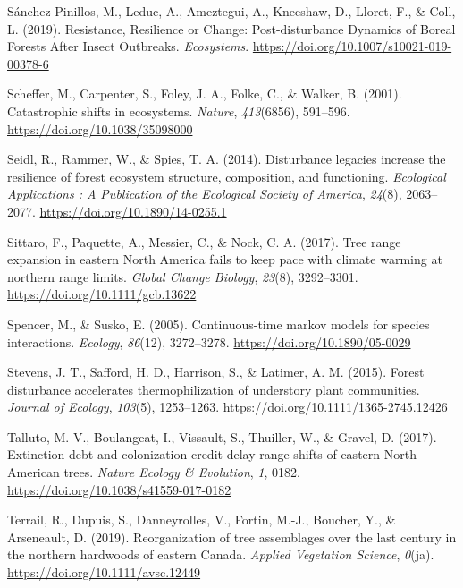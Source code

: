 \documentclass[a4paperpaper,]{article}
\begin{document}
\leavevmode\hypertarget{ref-sanchez-pinillos_resistance_2019}{}%
Sánchez-Pinillos, M., Leduc, A., Ameztegui, A., Kneeshaw, D., Lloret,
F., \& Coll, L. (2019). Resistance, Resilience or Change:
Post-disturbance Dynamics of Boreal Forests After Insect Outbreaks.
\emph{Ecosystems}. \url{https://doi.org/10.1007/s10021-019-00378-6}

\leavevmode\hypertarget{ref-scheffer_catastrophic_2001}{}%
Scheffer, M., Carpenter, S., Foley, J. A., Folke, C., \& Walker, B.
(2001). Catastrophic shifts in ecosystems. \emph{Nature},
\emph{413}(6856), 591--596. \url{https://doi.org/10.1038/35098000}

\leavevmode\hypertarget{ref-seidl_disturbance_2014}{}%
Seidl, R., Rammer, W., \& Spies, T. A. (2014). Disturbance legacies
increase the resilience of forest ecosystem structure, composition, and
functioning. \emph{Ecological Applications : A Publication of the
Ecological Society of America}, \emph{24}(8), 2063--2077.
\url{https://doi.org/10.1890/14-0255.1}

\leavevmode\hypertarget{ref-sittaro_tree_2017}{}%
Sittaro, F., Paquette, A., Messier, C., \& Nock, C. A. (2017). Tree
range expansion in eastern North America fails to keep pace with climate
warming at northern range limits. \emph{Global Change Biology},
\emph{23}(8), 3292--3301. \url{https://doi.org/10.1111/gcb.13622}

\leavevmode\hypertarget{ref-spencer_continuous-time_2005}{}%
Spencer, M., \& Susko, E. (2005). Continuous-time markov models for
species interactions. \emph{Ecology}, \emph{86}(12), 3272--3278.
\url{https://doi.org/10.1890/05-0029}

\leavevmode\hypertarget{ref-stevens_forest_2015}{}%
Stevens, J. T., Safford, H. D., Harrison, S., \& Latimer, A. M. (2015).
Forest disturbance accelerates thermophilization of understory plant
communities. \emph{Journal of Ecology}, \emph{103}(5), 1253--1263.
\url{https://doi.org/10.1111/1365-2745.12426}

\leavevmode\hypertarget{ref-talluto_extinction_2017}{}%
Talluto, M. V., Boulangeat, I., Vissault, S., Thuiller, W., \& Gravel,
D. (2017). Extinction debt and colonization credit delay range shifts of
eastern North American trees. \emph{Nature Ecology \& Evolution},
\emph{1}, 0182. \url{https://doi.org/10.1038/s41559-017-0182}

\leavevmode\hypertarget{ref-terrail_reorganization_2019}{}%
Terrail, R., Dupuis, S., Danneyrolles, V., Fortin, M.-J., Boucher, Y.,
\& Arseneault, D. (2019). Reorganization of tree assemblages over the
last century in the northern hardwoods of eastern Canada. \emph{Applied
Vegetation Science}, \emph{0}(ja).
\url{https://doi.org/10.1111/avsc.12449}
\end{document}
